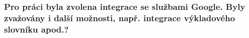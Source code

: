 \begin{frame}[noframenumbering]
\begin{center}
    \frametitle{Pro práci byla zvolena integrace se službami Google. Byly zvažovány i další možnosti, např. integrace výkladového slovníku apod.?}

\end{center}
\end{frame}


